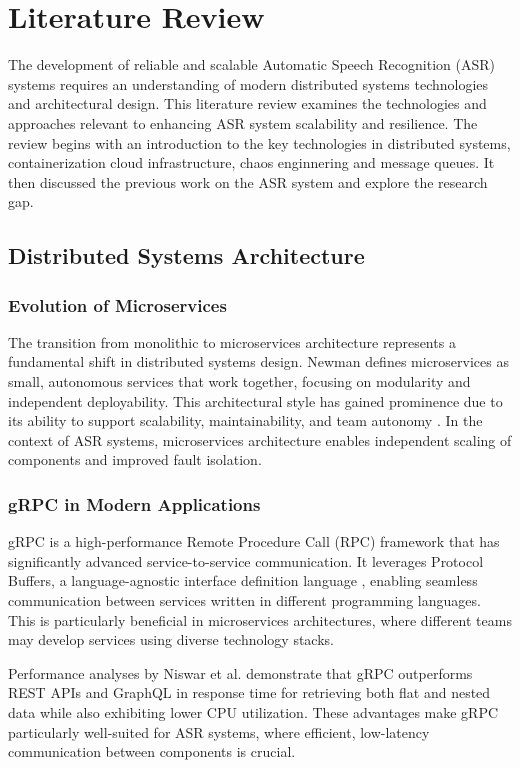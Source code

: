 \chapter{Literature Review} \label{chapter:literature_review}
The development of reliable and scalable Automatic Speech Recognition (ASR) systems requires an understanding of modern distributed systems technologies and architectural design. This literature review examines the technologies and approaches relevant to enhancing ASR system scalability and resilience. The review begins with an introduction to the key technologies in distributed systems, containerization cloud infrastructure, chaos enginnering and message queues. It then discussed the previous work on the ASR system and explore the research gap.

\section{Distributed Systems Architecture}
\subsection{Evolution of Microservices}
The transition from monolithic to microservices architecture represents a fundamental shift in distributed systems design. Newman \cite{newman} defines microservices as small, autonomous services that work together, focusing on modularity and independent deployability. This architectural style has gained prominence due to its ability to support scalability, maintainability, and team autonomy \cite{microservices_benefits}. In the context of ASR systems, microservices architecture enables independent scaling of components and improved fault isolation.

\subsection{gRPC in Modern Applications}
gRPC is a high-performance Remote Procedure Call (RPC) framework \cite{grpc} that has significantly advanced service-to-service communication. It leverages Protocol Buffers, a language-agnostic interface definition language \cite{protocol_buffers}, enabling seamless communication between services written in different programming languages. This is particularly beneficial in microservices architectures, where different teams may develop services using diverse technology stacks. 

Performance analyses by Niswar et al. \cite{grpc_comparison} demonstrate that gRPC outperforms REST APIs and GraphQL in response time for retrieving both flat and nested data while also exhibiting lower CPU utilization. These advantages make gRPC particularly well-suited for ASR systems, where efficient, low-latency communication between components is crucial.

